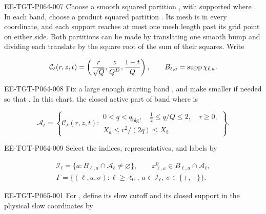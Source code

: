 \begin{EESegment}{EE-TGT-P064-007}
Choose a smooth squared partition , with  supported where . In each band, choose a product squared partition . Its mesh is  in every coordinate, and each support reaches at most one mesh length past its grid point on either side. Both partitions can be made by translating one smooth bump and dividing each translate by the square root of the sum of their squares. Write
\end{EESegment}
\[
 \mathcal C_\ell(r,z,t)=\left(\frac r{\sqrt Q},\frac z{Q^D},\frac{1-t}{Q}\right),
 \qquad
 B_{\ell,a}=\operatorname{supp}\chi_{\ell,a}.
\]
\begin{EESegment}{EE-TGT-P064-008}
Fix a large enough starting band , and make  smaller if needed so that . In this chart, the closed active part of band  where  is
\end{EESegment}
\[
 \mathcal A_\ell=
 \left\{\mathcal C_\ell(r,z,t):
 \begin{array}{c}
 0<q<q_{\mathrm{big}},\quad \frac12\le q/Q\le2,\quad \tau\ge0,\\[2pt]
 X_a\le r^2/(2q)\le X_b
 \end{array}
 \right\}.
\]
\begin{EESegment}{EE-TGT-P064-009}
Select the indices, representatives, and labels by
\end{EESegment}
\begin{equation}
\begin{gathered}
 \mathcal I_\ell=\{a:B_{\ell,a}\cap\mathcal A_\ell\ne\varnothing\},
 \qquad x^0_{\ell,a}\in B_{\ell,a}\cap\mathcal A_\ell,\\
 \Gamma=\{(\ell,a,\sigma):\ell\ge\ell_0,\ a\in\mathcal I_\ell,\ \sigma\in\{+,-\}\}.
\end{gathered}
 \tag{6.8}\label{eq:6.8}
\end{equation}
%
\begin{EESegment}{EE-TGT-P065-001}
For , define its slow cutoff and its closed support in the physical slow coordinates by
\end{EESegment}
